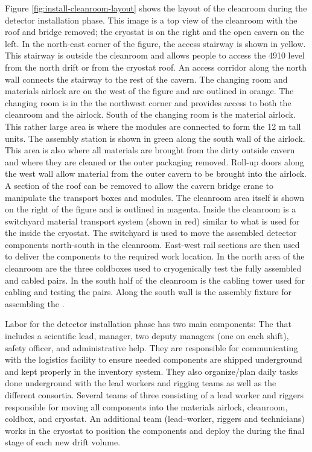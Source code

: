 Figure \ref{fig:install-cleanroom-layout} shows the layout of the cleanroom during the detector installation phase. This image is a top view of the cleanroom with the roof and bridge removed; the cryostat is on the right and the open cavern on the left. In the north-east corner of the figure, the access stairway is shown in yellow. This stairway is outside the cleanroom and allows people to access the 4910 level from the north drift or from the cryostat roof. An access corridor along the north wall connects the stairway to the rest of the cavern. The changing room and materials airlock are on the west of the figure and are outlined in orange. The changing room is in the the northwest corner and provides access to both the cleanroom and the airlock. South of the changing room is the material airlock. This rather large area is where the  modules are connected to form the 12 \si{m} tall units. The assembly station is shown in green along the south wall of the airlock. This area is also where all materials are brought from the dirty outside cavern and where they are cleaned or the outer packaging removed. Roll-up doors along the west wall allow material from the outer cavern to be brought into the airlock. A section of the roof can be removed to allow the cavern bridge crane to manipulate the  transport boxes and modules. The cleanroom area itself is shown on the right of the figure and is outlined in magenta. Inside the cleanroom is a switchyard material transport system (shown in red) similar to what is used for the  inside the cryostat. The switchyard is used to move the assembled detector components north-south in the cleanroom. East-west rail sections are then used to deliver the components to the required work location. In the north area of the cleanroom are the three coldboxes used to cryogenically test the fully assembled and cabled  pairs. In the south half of the cleanroom is the  cabling tower used for cabling and testing the  pairs. Along the south wall is the  assembly fixture for assembling the . 

Labor for the detector installation phase has two main components: 
The  that includes a scientific lead, manager, two deputy managers (one on each shift), safety officer, and administrative help. They are responsible for communicating with the %
logistics facility to ensure needed components are shipped underground and kept properly in the inventory system.  They also organize/plan daily tasks done underground with the lead workers and rigging teams as well as the different consortia.  Several teams of three  consisting of a lead worker and riggers responsible for moving all  components into the materials airlock,  cleanroom, coldbox, and cryostat. An additional team (lead--worker, riggers and technicians) works in the cryostat to position the  components and deploy the  during the final stage of each new drift volume. 

